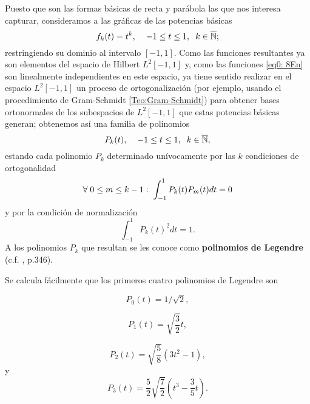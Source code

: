 \begin{comment}
Nuestro acercamiento es como sigue:
\end{comment}
Puesto que son las
formas básicas de recta y parábola las que nos interesa
capturar,
consideramos a las gráficas de las potencias básicas
\begin{equation}
\label{eq0: 8En}
f_{k}(t)= t^{k}, \hspace{0.4cm}
-1 \leq t \leq 1, \hspace{0.2cm}
 k \in \overline{\mathbb{N}};
\end{equation}
restringiendo su dominio al intervalo $[-1,1]$.
Como las funciones
resultantes ya son elementos del 
espacio de Hilbert $L^{2}[-1,1]$
y, como las funciones \eqref{eq0: 8En} son linealmente
independientes en este espacio, ya tiene sentido realizar
en el espacio $L^{2}[-1,1]$  un proceso de ortogonalización
(por ejemplo, usando el procedimiento de Gram-Schmidt 
\ref{Teo:Gram-Schmidt}) para obtener bases ortonormales
de los subespacios de $L^{2}[-1,1]$ que estas potencias
básicas generan; obtenemos así una familia de polinomios 
\begin{equation}
\label{eq1: 8En}
P_{k}(t), \hspace{0.4cm}
-1 \leq t \leq 1, \hspace{0.2cm}
 k \in \overline{\mathbb{N}},
\end{equation}
estando cada polinomio $P_{k}$ determinado unívocamente
por las $k$ condiciones de ortogonalidad
\[
\forall \hspace{0.1cm} 0 \leq m \leq k-1: \hspace{0.1cm}
\int_{-1}^{1}{P_{k}(t)P_{m}(t)} dt = 0
\]
y por la condición de normalización 
\[
\int_{-1}^{1}{P_{k}(t)^{2}} dt = 1.
\]
A los polinomios $P_{k}$ que resultan
se les conoce como \textbf{polinomios de Legendre}
 (c.f. \cite{friedberg} , p.346).

Se calcula fácilmente que los primeros cuatro 
polinomios de Legendre son

\[
P_{0}(t) = 1/\sqrt{2},
\]

\[
P_{1}(t) = \sqrt{\frac{3}{2}}t,
\]

\[
P_{2}(t) = \sqrt{\frac{5}{8}}\left( 3t^{2}-1 \right),
\]
y
\[
P_{3}(t) = \frac{5}{2} \sqrt{\frac{7}{2}}\left( t^{3}- \frac{3}{5}t\right).
\]


